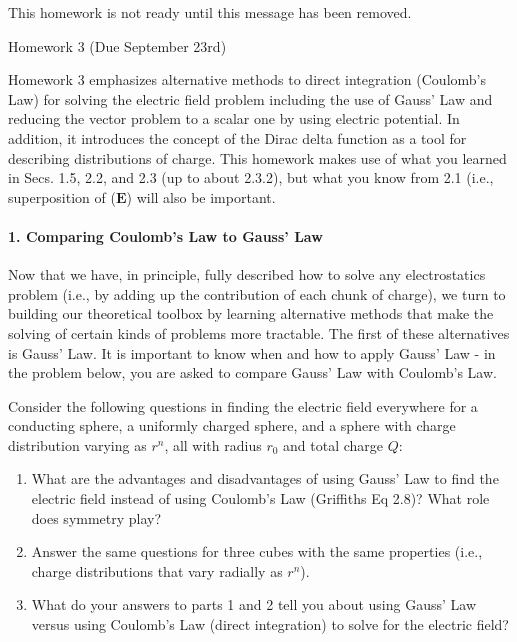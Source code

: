 \documentclass[11pt]{article}
\def\tightlist{}
\begin{document}
This homework is not ready until this message has been removed.

{\LARGE Homework 3 (Due September
23rd)}\label{homework-3-due-september-23rd}

Homework 3 emphasizes alternative methods to direct integration
(Coulomb's Law) for solving the electric field problem including the use
of Gauss' Law and reducing the vector problem to a scalar one by using
electric potential. In addition, it introduces the concept of the Dirac
delta function as a tool for describing distributions of charge. This
homework makes use of what you learned in Secs. 1.5, 2.2, and 2.3 (up to
about 2.3.2), but what you know from 2.1 (i.e., superposition of
(\(\mathbf{E}\)) will also be important.

\paragraph{1. Comparing Coulomb's Law to Gauss'
Law}\label{comparing-coulombs-law-to-gauss-law}

Now that we have, in principle, fully described how to solve any
electrostatics problem (i.e., by adding up the contribution of each
chunk of charge), we turn to building our theoretical toolbox by
learning alternative methods that make the solving of certain kinds of
problems more tractable. The first of these alternatives is Gauss' Law.
It is important to know when and how to apply Gauss' Law - in the
problem below, you are asked to compare Gauss' Law with Coulomb's Law.

Consider the following questions in finding the electric field
everywhere for a conducting sphere, a uniformly charged sphere, and a
sphere with charge distribution varying as \(r^n\), all with radius
\(r_0\) and total charge \(Q\):

\begin{enumerate}
\def\labelenumi{\arabic{enumi}.}
\tightlist
\item
  What are the advantages and disadvantages of using Gauss' Law to find
  the electric field instead of using Coulomb's Law (Griffiths Eq 2.8)?
  What role does symmetry play?
\item
  Answer the same questions for three cubes with the same properties
  (i.e., charge distributions that vary radially as \(r^n\)).
\item
  What do your answers to parts 1 and 2 tell you about using Gauss' Law
  versus using Coulomb's Law (direct integration) to solve for the
  electric field?
\end{enumerate}
\end{document}
